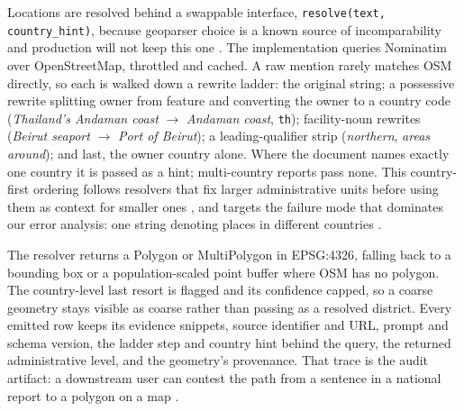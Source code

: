 Locations are resolved behind a swappable interface, \texttt{resolve(text,
country\_hint)}, because geoparser choice is a known source of incomparability
and production will not keep this one
\citep{gritta2018Missing,halterman2023Mordecai3}. The implementation queries
Nominatim over OpenStreetMap, throttled and cached. A raw mention rarely
matches OSM directly, so each is walked down a rewrite ladder: the original
string; a possessive rewrite splitting owner from feature and converting the
owner to a country code (\emph{Thailand's Andaman coast} $\rightarrow$
\emph{Andaman coast}, \texttt{th}); facility-noun rewrites (\emph{Beirut
seaport} $\rightarrow$ \emph{Port of Beirut}); a leading-qualifier strip
(\emph{northern}, \emph{areas around}); and last, the owner country alone.
Where the document names exactly one country it is passed as a hint;
multi-country reports pass none. This country-first ordering follows resolvers
that fix larger administrative units before using them as context for smaller
ones \citep{zhang2023GeoNorm}, and targets the failure mode that dominates our
error analysis: one string denoting places in different countries
\citep{gritta2018WhichMelbourne}.

The resolver returns a Polygon or MultiPolygon in EPSG:4326, falling back to a
bounding box or a population-scaled point buffer where OSM has no polygon. The
country-level last resort is flagged and its confidence capped, so a coarse
geometry stays visible as coarse rather than passing as a resolved district.
Every emitted row keeps its evidence snippets, source identifier and URL,
prompt and schema version, the ladder step and country hint behind the query,
the returned administrative level, and the geometry's provenance. That trace
is the audit artifact: a downstream user can contest the path from a sentence
in a national report to a polygon on a map \citep{raji2020InternalAuditing}.
